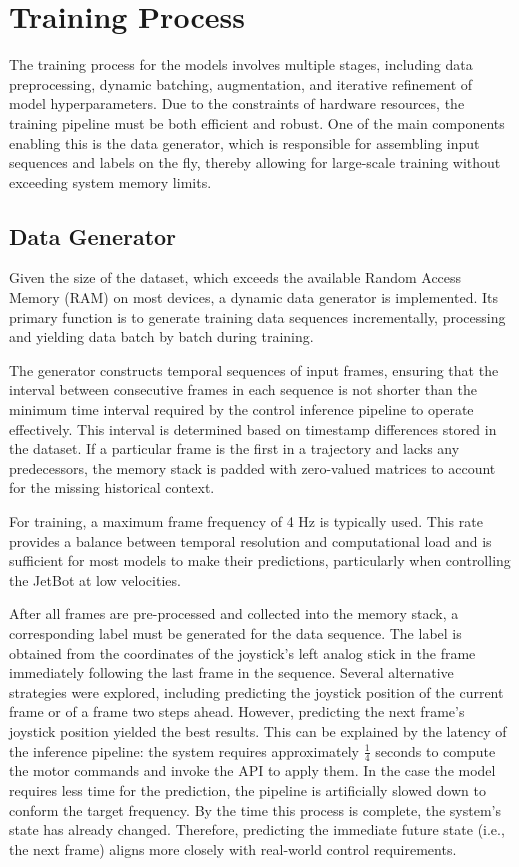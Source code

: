 \section{Training Process}

The training process for the models involves multiple stages, including data preprocessing, dynamic batching, augmentation, and iterative refinement of model hyperparameters. Due to the constraints of hardware resources, the training pipeline must be both efficient and robust. One of the main components enabling this is the data generator, which is responsible for assembling input sequences and labels on the fly, thereby allowing for large-scale training without exceeding system memory limits.

\subsection{Data Generator}

Given the size of the dataset, which exceeds the available Random Access Memory (RAM) on most devices, a dynamic data generator is implemented. Its primary function is to generate training data sequences incrementally, processing and yielding data batch by batch during training.

The generator constructs temporal sequences of input frames, ensuring that the interval between consecutive frames in each sequence is not shorter than the minimum time interval required by the control inference pipeline to operate effectively. This interval is determined based on timestamp differences stored in the dataset. If a particular frame is the first in a trajectory and lacks any predecessors, the memory stack is padded with zero-valued matrices to account for the missing historical context.

For training, a maximum frame frequency of 4 Hz is typically used. This rate provides a balance between temporal resolution and computational load and is sufficient for most models to make their predictions, particularly when controlling the JetBot at low velocities.

After all frames are pre-processed and collected into the memory stack, a corresponding label must be generated for the data sequence. The label is obtained from the coordinates of the joystick's left analog stick in the frame immediately following the last frame in the sequence. Several alternative strategies were explored, including predicting the joystick position of the current frame or of a frame two steps ahead. However, predicting the next frame's joystick position yielded the best results. This can be explained by the latency of the inference pipeline: the system requires approximately $\frac{1}{4}$ seconds to compute the motor commands and invoke the API to apply them. In the case the model requires less time for the prediction, the pipeline is artificially slowed down to conform the target frequency. By the time this process is complete, the system's state has already changed. Therefore, predicting the immediate future state (i.e., the next frame) aligns more closely with real-world control requirements.

